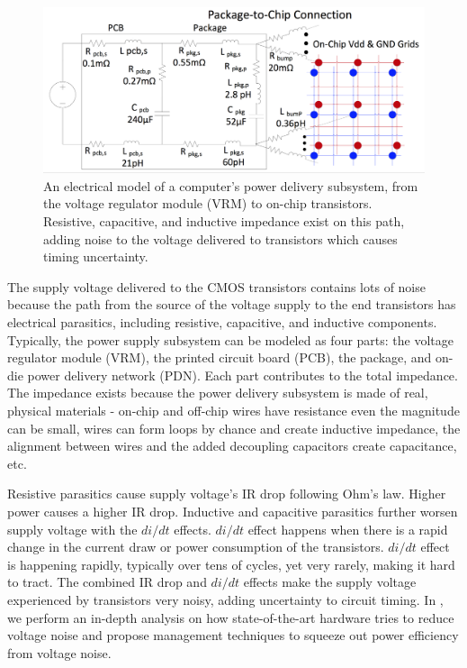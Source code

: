 \begin{figure}[t!]
  \centering
  \includegraphics[trim=0 0 0 0,clip,width=0.8\linewidth]{graphs/background/pdn-model.png}
  \caption{An electrical model of a computer's power delivery subsystem, from the voltage regulator module (VRM) to on-chip transistors. Resistive, capacitive, and inductive impedance exist on this path, adding noise to the voltage delivered to transistors which causes timing uncertainty.}
  \label{fig:pdn-model}
\end{figure}

The supply voltage delivered to the CMOS transistors contains lots of noise because the path from the source of the voltage supply to the end transistors has electrical parasitics, including resistive, capacitive, and inductive components. Typically, the power supply subsystem can be modeled as four parts: the voltage regulator module (VRM), the printed circuit board (PCB), the package, and on-die power delivery network (PDN). Each part contributes to the total impedance. The impedance exists because the power delivery subsystem is made of real, physical materials - on-chip and off-chip wires have resistance even the magnitude can be small, wires can form loops by chance and create inductive impedance, the alignment between wires and the added decoupling capacitors create capacitance, etc.

Resistive parasitics cause supply voltage's IR drop following Ohm's law. Higher power causes a higher IR drop. Inductive and capacitive parasitics further worsen supply voltage with the $di/dt$ effects. $di/dt$ effect happens when there is a rapid change in the current draw or power consumption of the transistors. $di/dt$ effect is happening rapidly, typically over tens of cycles, yet very rarely, making it hard to tract. The combined IR drop and $di/dt$ effects make the supply voltage experienced by transistors very noisy, adding uncertainty to circuit timing. In , we perform an in-depth analysis on how state-of-the-art hardware tries to reduce voltage noise and propose management techniques to squeeze out power efficiency from voltage noise.

